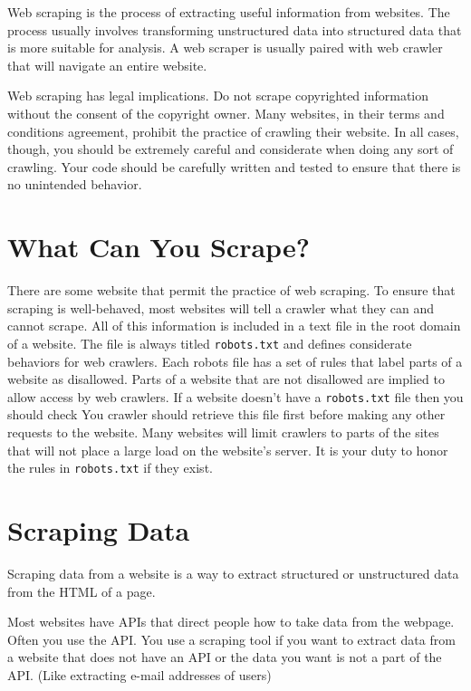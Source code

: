 
Web scraping is the process of extracting useful information from websites.
The process usually involves transforming unstructured data into structured data that is more 
suitable for analysis.
A web scraper is usually paired with web crawler that will navigate an entire website.

\begin{warn}
Web scraping has legal implications.
Do not scrape copyrighted information without the consent of the copyright owner.
Many websites, in their terms and conditions agreement, prohibit the practice of crawling their 
website.
In all cases, though, you should be extremely careful and considerate when doing any sort of 
crawling.
Your code should be carefully written and tested to ensure that there is no unintended behavior.
\end{warn}

\section*{What Can You Scrape?}
There are some website that permit the practice of web scraping.
To ensure that scraping is well-behaved, most websites will tell a crawler what they can and cannot 
scrape.
All of this information is included in a text file in the root domain of a website.
The file is always titled \texttt{robots.txt} and defines considerate behaviors for web crawlers.
Each robots file has a set of rules that label parts of a website as disallowed.
Parts of a website that are not disallowed are implied to allow access by web crawlers.
If a website doesn't have a \texttt{robots.txt} file then you should check
You crawler should retrieve this file first before making any other requests to the website.
Many websites will limit crawlers to parts of the sites that will not place a large load on the 
website's server.
It is your duty to honor the rules in \texttt{robots.txt} if they exist.

\section*{Scraping Data}
Scraping data from a website is a way to extract structured or unstructured data from the HTML of a page.

Most websites have APIs that direct people how to take data from the webpage. 
Often you use the API. 
You use a scraping tool if you want to extract data from a website that does not have an API or the data you want is not a part of the API.
 (Like extracting e-mail addresses of users)

